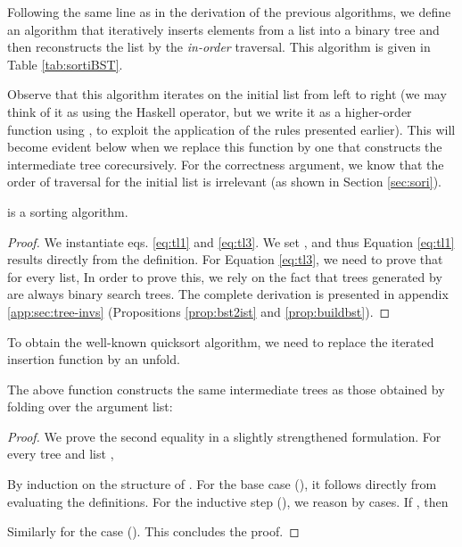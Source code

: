 \documentclass[a4paper,11pt]{llncs}
\begin{document}
Following the same line as in the derivation of the previous
algorithms, we define an algorithm that iteratively inserts elements
from a list into a binary tree and then reconstructs the list by the
\emph{in-order} traversal.  This algorithm is given in Table
\ref{tab:sortiBST}.

Observe that this algorithm iterates on the initial list from left to
right (we may think of it as using the Haskell  operator, but
we write it as a higher-order function using , to exploit the
application of the rules presented earlier). This will become evident
below when we replace this function by one that constructs the
intermediate tree corecursively. For the correctness argument, we know
that the order of traversal for the initial list is irrelevant (as
shown in Section \ref{sec:sori}).

\begin{proposition}
   is a sorting algorithm.  
\end{proposition}
\begin{proof}
  We instantiate eqs. \ref{eq:tl1} and \ref{eq:tl3}. We set , and thus Equation \ref{eq:tl1} results directly from the
  definition. For Equation \ref{eq:tl3}, we need to prove that for
  every list,
   In order to prove this, we rely on the fact
  that trees generated by  are always binary search
  trees. The complete derivation is presented in appendix
  \ref{app:sec:tree-invs} (Propositions \ref{prop:bst2ist} and
  \ref{prop:buildbst}).
\end{proof}  


To obtain the well-known quicksort algorithm, we need to replace the
iterated insertion function  by an unfold.




\begin{proposition}
\label{prop:buildBST-unfold}
  The above function constructs the same intermediate trees as those
  obtained by folding over the argument list:
  
\end{proposition}
\begin{proof}


We prove the second equality in a slightly strengthened formulation.
For every tree  and list ,

By induction on the structure of . For the base case (),
it follows directly from evaluating the definitions. For the inductive
step (), we reason by cases. If , then

Similarly for the case ().  This concludes the proof.

\end{proof}
\end{document}
